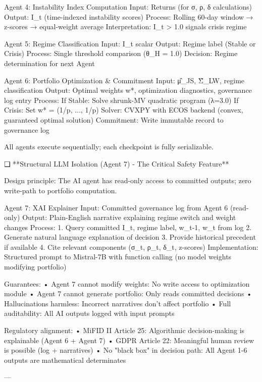 Agent 4: Instability Index Computation
   Input: Returns (for σ, ρ, δ calculations)
   Output: I_t (time-indexed instability scores)
   Process: Rolling 60-day window → z-scores → equal-weight average
   Interpretation: I_t > 1.0 signals crisis regime

Agent 5: Regime Classification
   Input: I_t scalar
   Output: Regime label (Stable or Crisis)
   Process: Single threshold comparison (θ_H = 1.0)
   Decision: Regime determination for next Agent

Agent 6: Portfolio Optimization & Commitment
   Input: μ̂_{JS}, Σ̂_{LW}, regime classification
   Output: Optimal weights w*, optimization diagnostics, governance log entry
   Process:
      If Stable: Solve shrunk-MV quadratic program (λ=3.0)
      If Crisis: Set w* = (1/p, ..., 1/p)
   Solver: CVXPY with ECOS backend (convex, guaranteed optimal solution)
   Commitment: Write immutable record to governance log

All agents execute sequentially; each checkpoint is fully serializable.

❑ **Structural LLM Isolation (Agent 7) - The Critical Safety Feature**

Design principle: The AI agent has read-only access to committed outputs; zero write-path to portfolio computation.

Agent 7: XAI Explainer
   Input: Committed governance log from Agent 6 (read-only)
   Output: Plain-English narrative explaining regime switch and weight changes
   Process:
      1. Query committed I_t, regime label, w_{t-1}, w_t from log
      2. Generate natural language explanation of decision
      3. Provide historical precedent if available
      4. Cite relevant components (σ_t, ρ_t, δ_t, z-scores)
   Implementation: Structured prompt to Mistral-7B with function calling (no model weights modifying portfolio)

Guarantees:
   • Agent 7 cannot modify weights: No write access to optimization module
   • Agent 7 cannot generate portfolio: Only reads committed decisions
   • Hallucinations harmless: Incorrect narratives don't affect portfolio
   • Full auditability: All AI outputs logged with input prompts

Regulatory alignment:
   • MiFID II Article 25: Algorithmic decision-making is explainable (Agent 6 + Agent 7)
   • GDPR Article 22: Meaningful human review is possible (log + narratives)
   • No "black box" in decision path: All Agent 1-6 outputs are mathematical determinates

---

